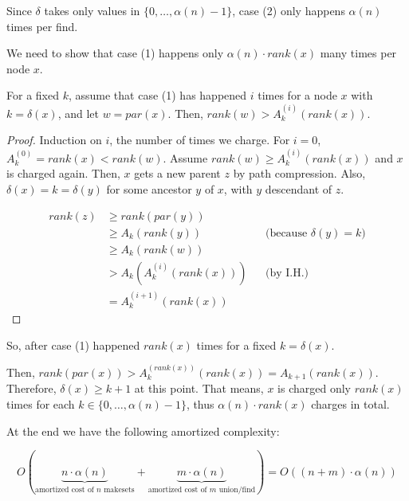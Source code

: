 Since $\delta$ takes only values in $\{0, \ldots, \alpha(n) - 1\}$, case (2) only happens $\alpha(n)$ times per find.

We need to show that case (1) happens only $\alpha(n) \cdot {rank}(x)$ many times per node $x$.

\begin{mylemma}
For a fixed $k$, assume that case (1) has happened $i$ times for a node $x$ with $k = \delta(x)$, and let $w = {par}(x)$. Then, ${rank}(w) > A_k^{(i)}(rank(x))$.
\end{mylemma}
\begin{proof}
Induction on $i$, the number of times we charge. For $i= 0$, $A_k^{(0)} = {rank}(x) < {rank}(w)$.
Assume ${rank}(w) \ge A_k^{(i)}({rank}(x))$ and $x$ is charged again. Then, $x$ gets a new parent $z$ by path compression. Also, $\delta(x) = k = \delta(y)$ for some ancestor $y$ of $x$, with $y$ descendant of $z$.

\begin{align*}
{rank}(z) &\ge {rank}({par}(y)) \\
& \ge A_k({rank}(y)) && \text{(because $\delta(y) = k$)} \\
& \ge A_k({rank}(w)) \\
& > A_k(A_k^{(i)}({rank}(x))) && \text{(by I.H.)} \\
& = A_k^{(i+1)}({rank}(x))
\end{align*}
\end{proof}

So, after case (1) happened ${rank}(x)$ times for a fixed $k = \delta(x)$.

Then, ${rank}({par}(x)) > A_k^{({rank}(x))}({rank}(x)) = A_{k+1}({rank}(x))$. Therefore,
$\delta(x) \ge k+1$ at this point. That means, $x$ is charged only ${rank}(x)$ times for each $k\in \{0, \ldots, \alpha(n) - 1\}$, thus $\alpha(n)\cdot {rank}(x)$ charges in total.

\bigskip At the end we have the following amortized complexity:

$$O(\underbrace{n \cdot \alpha(n)}_\text{amortized cost of $n$ makesets} + \underbrace{m \cdot \alpha(n)}_\text{amortized cost of $m$ union/find}) = O((n+m) \cdot \alpha(n))$$





